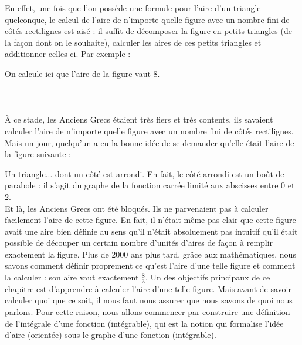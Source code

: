 \documentclass[a4paper,fontsize=13pt]{scrreprt}
\theoremstyle{plain}
\theoremstyle{definition}
\newcommand {\axes} {
	\draw[thick, ->] (\xmin,0) -- (\xmax+1,0);
	\draw[thick, ->] (0,\ymin) -- (0,\ymax+1);
	\draw (0,\ymax+0.5) node [left] {$y$};
	\draw (\xmax+0.5, 0) node [below] {$x$};
	\draw[thick] (-0.15,1)--(0.15,1) (1,-0.15)--(1,0.15);
	\draw (0,1)node[left]{$1$} (1,0)node[below]{$1$};
}
\begin{document}
En effet, une fois que l'on possède une formule pour l'aire d'un triangle quelconque, le calcul de l'aire de n'importe quelle figure avec un nombre fini de côtés rectilignes est aisé : il suffit de décomposer la figure en petits triangles (de la façon dont on le souhaite), calculer les aires de ces petits triangles et additionner celles-ci. Par exemple :
\begin{center}
\end{center}
On calcule ici que l'aire de la figure vaut 8. \\
~\\~\\~\\
À ce stade, les Anciens Grecs étaient très fiers et très contents, ils savaient calculer l'aire de n'importe quelle figure avec un nombre fini de côtés rectilignes. Mais un jour, quelqu'un a eu la bonne idée de se demander qu'elle était l'aire de la figure suivante :
\begin{center}
\end{center}
Un triangle... dont un côté est arrondi. En fait, le côté arrondi est un boût de parabole : il s'agit du graphe de la fonction carrée limité aux abscisses entre 0 et 2. \\
Et là, les Anciens Grecs ont été bloqués. Ils ne parvenaient pas à calculer facilement l'aire de cette figure. En fait, il n'était même pas clair que cette figure avait une aire bien définie au sens qu'il n'était absoluement pas intuitif qu'il était possible de découper un certain nombre d'unités d'aires de façon à remplir exactement la figure. \newpage
Plus de 2000 ans plus tard, grâce aux mathématiques, nous savons comment définir proprement ce qu'est l'aire d'une telle figure et comment la calculer : son aire vaut exactement $\frac{8}{3}$. Un des objectifs principaux de ce chapitre est d'apprendre à calculer l'aire d'une telle figure. Mais avant de savoir calculer quoi que ce soit, il nous faut nous assurer que nous savons de quoi nous parlons. Pour cette raison, nous allons commencer par construire une définition de l'intégrale d'une fonction (intégrable), qui est la notion qui formalise l'idée d'aire (orientée) sous le graphe d'une fonction (intégrable).
\end{document}
